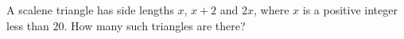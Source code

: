 A scalene triangle has side lengths $x$, $x+2$ and $2x$, where $x$ is a positive integer less than $20$. How many such triangles are there?
